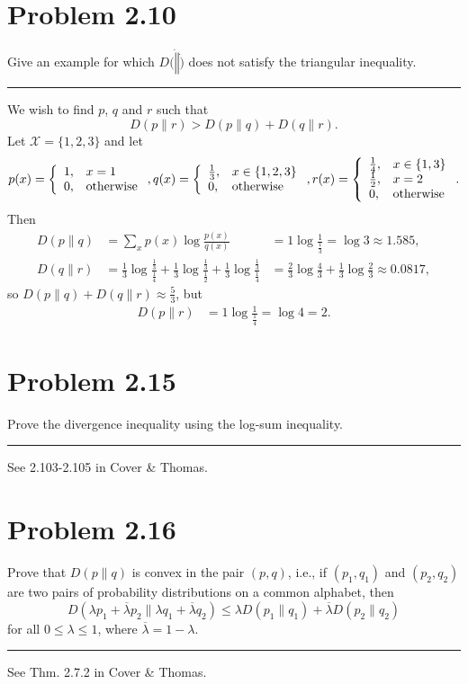 \documentclass{article}
\newcommand{\horline}
           {\begin{center}
              \noindent\rule{8cm}{0.4pt}
            \end{center}}
\begin{document}
\section*{Problem 2.10}
Give an example for which $D(\dot \| \dot)$ does not satisfy the triangular
inequality.
\horline
We wish to find $p$, $q$ and $r$ such that
$$
D(p \| r) > D(p \| q) + D(q \| r).
$$
Let $\mathcal{X} = \{1, 2, 3\}$ and let
$$
p(x) = \left\{ \begin{array}{l l}
                 1, & x = 1 \\
                 0, & \mbox{otherwise}
               \end{array} \right. ,
q(x) = \left\{ \begin{array}{l l}
                 \frac{1}{3}, & x \in \{1, 2, 3\} \\
                 0,           & \mbox{otherwise}
               \end{array} \right. ,
r(x) = \left\{ \begin{array}{l l}
                 \frac{1}{4}, & x \in \{1, 3\} \\
                 \frac{1}{2}, & x = 2 \\
                 0,           & \mbox{otherwise}
               \end{array} \right. .
$$
Then
\begin{align*}
D(p \| q) & = \sum_x p(x) \log \frac{p(x)}{q(x)} 
          & = 1 \log \frac{1}{\frac{1}{3}} = \log 3 \approx 1.585, \\
D(q \| r) & = \frac{1}{3} \log \frac{\frac{1}{3}}{\frac{1}{4}}
            + \frac{1}{3} \log \frac{\frac{1}{3}}{\frac{1}{2}}
            + \frac{1}{3} \log \frac{\frac{1}{3}}{\frac{1}{4}} 
          & = \frac{2}{3} \log \frac{4}{3} + \frac{1}{3} \log \frac{2}{3}
            \approx 0.0817,
\end{align*}
so $D(p \| q) + D(q \| r) \approx \frac{5}{3}$, but
\begin{align*}
D(p \| r) & = 1 \log \frac{1}{\frac{1}{4}} = \log 4 = 2.
\end{align*}

\section*{Problem 2.15}
Prove the divergence inequality using the log-sum inequality.
\horline
See 2.103-2.105 in Cover \& Thomas.

\section*{Problem 2.16}
Prove that $D(p \| q)$ is convex in the pair $(p,q)$, i.e., if $(p_1, q_1)$
and $(p_2, q_2)$ are two pairs of probability distributions on a common
alphabet, then
$$
D(\lambda p_1 + \overline{\lambda} p_2 \| \lambda q_1 + \overline{\lambda}q_2)
  \leq \lambda D(p_1 \| q_1) + \overline{\lambda} D(p_2 \| q_2)
$$
for all $0 \leq \lambda \leq 1$, where $\overline{\lambda} = 1 - \lambda$.
\horline
See Thm. 2.7.2 in Cover \& Thomas.
\end{document}
